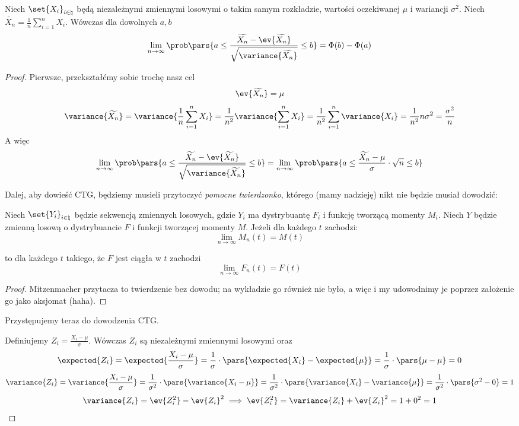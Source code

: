 \begin{theorem}
	Niech \(\set{X_i}_{i \in \natural}\) będą niezależnymi zmiennymi losowymi o takim samym rozkładzie, wartości oczekiwanej \( \mu\) i wariancji \( \sigma^2\). Niech \( \widetilde{X_n} = \frac{1}{n}\sum_{i=1}^n X_i \). Wówczas dla dowolnych \(a, b\)
	\[
		\lim_{n \to \infty} \prob \pars{a \leq \frac{ \widetilde{X_n} - \ev{\widetilde{X_n}}}{\sqrt{\variance{\widetilde{X_n}}}} \leq b} = \Phi(b) - \Phi(a)
	\]
\end{theorem}
\begin{proof}
	Pierwsze, przekształćmy sobie trochę nasz cel
	\[
		\ev{\widetilde{X_n}} = \mu
	\]
	\[
		\variance{\widetilde{X_n}} = \variance{\frac{1}{n}\sum_{i=1}^n X_i} = \frac{1}{n^2} \variance{\sum_{i=1}^n X_i} = \frac{1}{n^2} \sum_{i=1}^n \variance{X_i} = \frac{1}{n^2} n \sigma^2 = \frac{\sigma^2}{n}
	\]
	A więc
	\[
		\lim_{n \to \infty} \prob \pars{a \leq \frac{ \widetilde{X_n} - \ev{\widetilde{X_n}}}{\sqrt{\variance{\widetilde{X_n}}}} \leq b} = \lim_{n \to \infty} \prob \pars{a \leq \frac{ \widetilde{X_n} - \mu}{\sigma} \cdot \sqrt{n} \leq b}
	\]
	
	Dalej, aby dowieść CTG, będziemy musieli przytoczyć \textit{pomocne twierdzonko}, którego (mamy nadzieję) nikt nie będzie musiał dowodzić:

	\begin{theorem} 
		Niech \(\set{Y_i}_{i \in \natural}\) będzie sekwencją zmiennych losowych, gdzie \(Y_i\) ma dystrybuantę \(F_i\) i funkcję tworzącą momenty \( M_i\). Niech \(Y\) będzie zmienną losową o dystrybuancie \(F\) i funkcji tworzącej momenty \(M\). Jeżeli dla każdego \(t\) zachodzi:
		\[
			\lim_{n \to \infty}M_n(t) = M(t)
		\]

		to dla każdego \(t\) takiego, że \(F\) jest ciągła w \(t\) zachodzi
		\[
			\lim_{n \to \infty} F_n(t) = F(t)
		\]
	\end{theorem}
	\begin{proof}
		Mitzenmacher przytacza to twierdzenie bez dowodu; na wykładzie go również nie było, a więc i my udowodnimy je poprzez założenie go jako aksjomat (haha).
	\end{proof}

	Przystępujemy teraz do dowodzenia CTG.

	Definiujemy \( Z_i = \frac{X_i - \mu}{\sigma} \).
	Wówczas \( Z_i\) są niezależnymi zmiennymi losowymi oraz
	\[
		\expected{Z_i} = \expected{\frac{X_i - \mu}{ \sigma}} = \frac{1}{\sigma} \cdot \pars{\expected{X_i} - \expected{\mu}} = \frac{1}{\sigma} \cdot \pars{\mu - \mu} = 0
	\]
	\[
		\variance{Z_i} = \variance{\frac{X_i - \mu}{\sigma}} = \frac{1}{\sigma^2} \cdot \pars{\variance{X_i - \mu}} = \frac{1}{\sigma^2} \cdot \pars{\variance{X_i} - \variance{\mu}} = \frac{1}{\sigma^2} \cdot \pars{\sigma^2 - 0} = 1
	\]
	\[
		\variance{Z_i} = \ev{Z_i^2} - \ev{Z_i}^2 \implies \ev{Z_i^2} = \variance{Z_i} + \ev{Z_i}^2 = 1 + 0^2 = 1
	\]


\end{proof}
